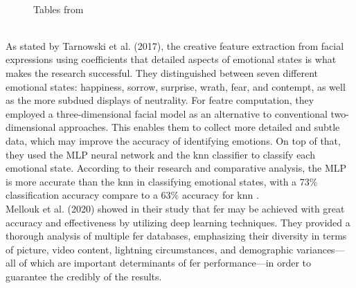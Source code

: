 \begin{figure}[!ht]
    \centering
    \qquad
    \vspace{0.5cm}
    \\
    \scriptsize{Tables from \cite{tarnowski_2017_emotion}}
\end{figure}
\\
\indent As stated by Tarnowski et al. (2017), the creative feature extraction from facial expressions using coefficients that detailed aspects of emotional states is what makes the research successful.
They distinguished between seven different emotional states: happiness, sorrow, surprise, wrath, fear, and contempt, as well as the more subdued displays of neutrality. 
For featre computation, they employed a three-dimensional facial model as an alternative to conventional two-dimensional approaches. 
This enables them to collect more detailed and subtle data, which may improve the accuracy of identifying emotions. 
On top of that, they used the MLP neural network and the \gls{knn} classifier to classify each emotional state. 
According to their research and comparative analysis, the MLP is more accurate than the \gls{knn} in classifying emotional states, with a 73\% classification accuracy compare to a 63\% accuracy for \gls{knn} \cite{tarnowski_2017_emotion}.
\\
\indent Mellouk et al. (2020) showed in their study that \gls{fer} may be achieved with great accuracy and effectiveness by utilizing deep learning techniques.
They provided a thorough analysis of multiple \gls{fer} databases, emphasizing their diversity in terms of picture, video content, lightning circumstances, and demographic variances—all of which are important determinants of \gls{fer} performance—in order to guarantee the credibly of the results.
